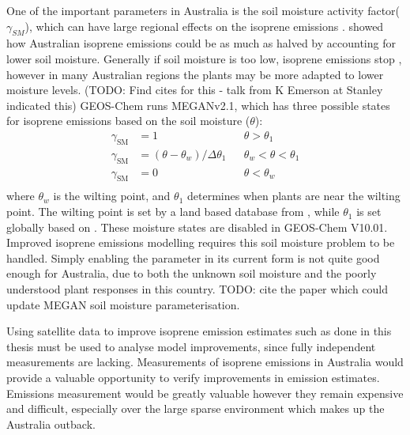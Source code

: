   One of the important parameters in Australia is the soil moisture activity factor($\gamma_{SM}$), which can have large regional effects on the isoprene emissions \parencite{Sindelarova2014,Bauwens2016}.
  \textcite{Sindelarova2014} showed how Australian isoprene emissions could be as much as halved by accounting for lower soil moisture.
  Generally if soil moisture is too low, isoprene emissions stop \parencite{Pegoraro2004,Niinemets2010}, however in many Australian regions the plants may be more adapted to lower moisture levels. (TODO: Find cites for this - talk from K Emerson at Stanley indicated this)
  GEOS-Chem runs MEGANv2.1, which has three possible states for isoprene emissions based on the soil moisture ($\theta$):
  \begin{align*}
  \gamma_\mathrm{SM} & = 1 && \theta > \theta_1 \\
  \gamma_\mathrm{SM} & = (\theta-\theta_w)/\Delta\theta_1  && \theta_w < \theta < \theta_1 \\
  \gamma_\mathrm{SM} & = 0 && \theta < \theta_w \\
  \end{align*}
  where $\theta_w$ is the wilting point, and $\theta_1$ determines when plants are near the wilting point.
  The wilting point is set by a land based database from \textcite{Chen2001}, while $\theta_1$ is set globally based on \textcite{Pegoraro2004}.
  These moisture states are disabled in GEOS-Chem V10.01.
  Improved isoprene emissions modelling requires this soil moisture problem to be handled.
  Simply enabling the parameter in its current form is not quite good enough for Australia, due to both the unknown soil moisture and the poorly understood plant responses in this country.
  TODO: cite the paper which could update MEGAN soil moisture parameterisation.
  
  Using satellite data to improve isoprene emission estimates such as done in this thesis must be used to analyse model improvements, since fully independent measurements are lacking.
  Measurements of isoprene emissions in Australia would provide a valuable opportunity to verify improvements in emission estimates.
  Emissions measurement would be greatly valuable however they remain expensive and difficult, especially over the large sparse environment which makes up the Australia outback.